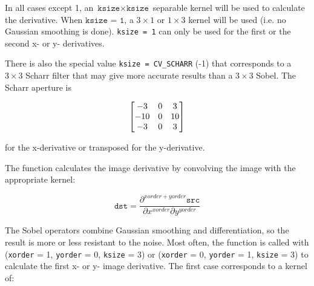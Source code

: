 \begin{description}
\end{description}

In all cases except 1, an $\texttt{ksize} \times
\texttt{ksize}$ separable kernel will be used to calculate the
derivative. When $\texttt{ksize = 1}$, a $ 3 \times 1$ or $ 1 \times 3$
kernel will be used (i.e. no Gaussian smoothing is done). \texttt{ksize = 1} can only be used for the first or the second x- or y- derivatives.

There is also the special value \texttt{ksize = CV\_SCHARR} (-1) that corresponds to a $3\times3$ Scharr
filter that may give more accurate results than a $3\times3$ Sobel. The Scharr
aperture is

\[ \begin{bmatrix} -3 & 0 & 3\\ -10 & 0 & 10\\ -3 & 0 & 3 \end{bmatrix}
\]

for the x-derivative or transposed for the y-derivative.

The function calculates the image derivative by convolving the image with the appropriate kernel:

\[
\texttt{dst} = \frac{\partial^{xorder+yorder} \texttt{src}}{\partial x^{xorder} \partial y^{yorder}}
\]

The Sobel operators combine Gaussian smoothing and differentiation,
so the result is more or less resistant to the noise. Most often,
the function is called with (\texttt{xorder} = 1, \texttt{yorder} = 0,
\texttt{ksize} = 3) or (\texttt{xorder} = 0, \texttt{yorder} = 1,
\texttt{ksize} = 3) to calculate the first x- or y- image
derivative. The first case corresponds to a kernel of:

